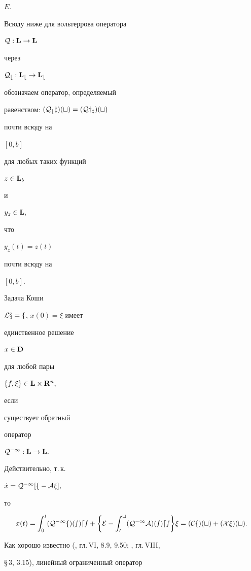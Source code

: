 $E.$


Всюду ниже для вольтеррова оператора


$\cal Q:\bold L\to\bold L$


через


$\cal Q_b:\bold L_b\to\bold L_b$


обозначаем оператор, определяемый


равенством: $(\cal Q_b z)(t) = (\cal Q y_z)(t)$


почти всюду на


$[0,b]$


для любых таких функций


$z\in\bold L_b$


и


$y_z\in\bold L,$


что


$y_z(t) = z(t)$


почти всюду на


$[0,b].$





Задача Коши


$\cal L x = f$, $x(0)=\xi$ имеет


единственное решение


$x\in\bold D$


для любой пары


$\{f,\xi\}\in \bold L\times\bold R^n,$


если


существует обратный


оператор


$\cal Q^{-1}:\bold L\to\bold L.$


Действительно, т.\,к.


$\Dot x = \cal Q^{-1}[f -A\xi],$


то


\begin{equation}


x(t) = \int_0^t(\cal Q^{-1}f)(s)ds +


\biggl\{E - \int_0^t(\cal Q^{-1}A)(s)ds\biggr\}\xi =


(\cal C f)(t) +(\cal X \xi)(t).


\end{equation}





Как хорошо известно (\cite{Dun}, гл.\,VI, 8.9, 9.50; \cite{Kant1}, гл.\,VIII,


\S\,3, 3.15), линейный ограниченный оператор


